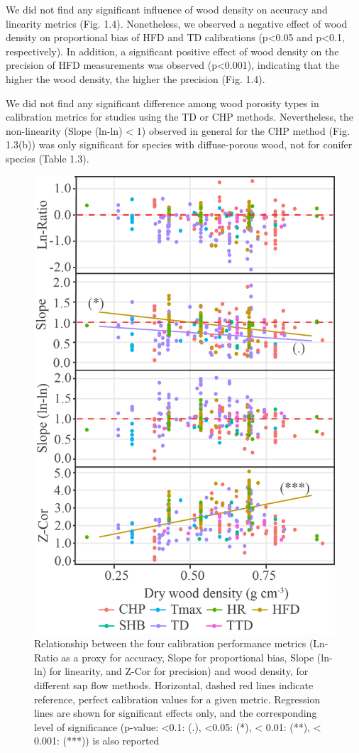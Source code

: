\documentclass[11pt,twoside]{reedthesis}
\begin{document}
We did not find any significant influence of wood density on accuracy
and linearity metrics (Fig. 1.4). Nonetheless, we observed a negative
effect of wood density on proportional bias of HFD and TD calibrations
(p\textless{}0.05 and p\textless{}0.1, respectively). In addition, a
significant positive effect of wood density on the precision of HFD
measurements was observed (p\textless{}0.001), indicating that the
higher the wood density, the higher the precision (Fig. 1.4).\par

We did not find any significant difference among wood porosity types in
calibration metrics for studies using the TD or CHP methods.
Nevertheless, the non-linearity (Slope (ln-ln) \textless{} 1) observed
in general for the CHP method (Fig. 1.3(b)) was only significant for
species with diffuse-porous wood, not for conifer species (Table
1.3).\par
\begin{figure}[hbt!]

{\centering \includegraphics[width=0.55\linewidth]{figure/CH2/DENSITY} 

}

\caption[Relationship between the four calibration performance and wood density, for different sap flow methods.]{Relationship between the four calibration performance metrics (Ln-Ratio as a proxy for accuracy, Slope for proportional bias, Slope (ln-ln) for linearity, and Z-Cor for precision) and wood density, for different sap flow methods. Horizontal, dashed red lines indicate reference, perfect calibration values for a given metric. Regression lines are shown for significant effects only, and the corresponding level of significance (p-value: <0.1: (.), <0.05: (*), < 0.01: (**), < 0.001: (***)) is also reported }\label{fig:ch2fig4}
\end{figure}
\end{document}
